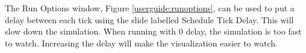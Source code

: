 \begin{figure}
\begin{center}
\end{center}
\end{figure}

The Run Options window, Figure \ref{userguide:runoptions}, can be used to put a delay between each tick using the slide labelled Schedule Tick Delay. This will slow down the simulation. When running with 0 delay, the simulation is too fast to watch. Increasing the delay will make the visualization easier to watch.


